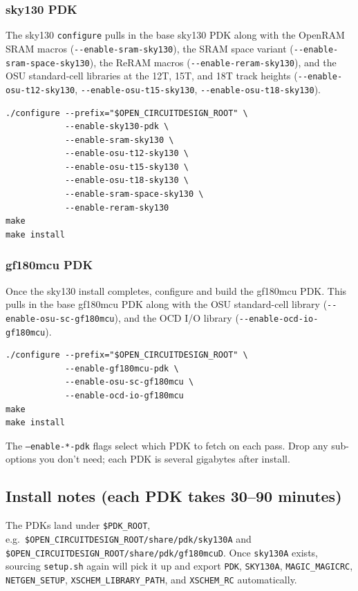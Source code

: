 \documentclass[11pt]{article}
\begin{document}
\subsubsection*{sky130 PDK}

The sky130 \texttt{configure} pulls in the base sky130 PDK along with the
OpenRAM SRAM macros (\texttt{-{}-enable-sram-sky130}), the SRAM space
variant (\texttt{-{}-enable-sram-space-sky130}), the ReRAM macros
(\texttt{-{}-enable-reram-sky130}), and the OSU standard-cell libraries at
the 12T, 15T, and 18T track heights
(\texttt{-{}-enable-osu-t12-sky130}, \texttt{-{}-enable-osu-t15-sky130},
\texttt{-{}-enable-osu-t18-sky130}).

\begin{lstlisting}
./configure --prefix="$OPEN_CIRCUITDESIGN_ROOT" \
            --enable-sky130-pdk \
            --enable-sram-sky130 \
            --enable-osu-t12-sky130 \
            --enable-osu-t15-sky130 \
            --enable-osu-t18-sky130 \
            --enable-sram-space-sky130 \
            --enable-reram-sky130
make
make install
\end{lstlisting}

\subsubsection*{gf180mcu PDK}

Once the sky130 install completes, configure and build the gf180mcu PDK.
This pulls in the base gf180mcu PDK along with the OSU standard-cell
library (\texttt{-{}-enable-osu-sc-gf180mcu}), and the OCD I/O library
(\texttt{-{}-enable-ocd-io-gf180mcu}).

\begin{lstlisting}
./configure --prefix="$OPEN_CIRCUITDESIGN_ROOT" \
            --enable-gf180mcu-pdk \
            --enable-osu-sc-gf180mcu \
            --enable-ocd-io-gf180mcu 
make
make install
\end{lstlisting}

The \texttt{--enable-*-pdk} flags select which PDK to fetch on each pass.
Drop any sub-options you don't need; each PDK is several gigabytes after
install.

\subsection{Install notes (each PDK takes 30--90 minutes)}

The PDKs land under \texttt{\$PDK\_ROOT}, e.g.\
\texttt{\$OPEN\_CIRCUITDESIGN\_ROOT/share/pdk/sky130A} and
\texttt{\$OPEN\_CIRCUITDESIGN\_ROOT/share/pdk/gf180mcuD}. Once
\texttt{sky130A} exists, sourcing \texttt{setup.sh} again will pick it up
and export \texttt{PDK}, \texttt{SKY130A}, \texttt{MAGIC\_MAGICRC},
\texttt{NETGEN\_SETUP}, \texttt{XSCHEM\_LIBRARY\_PATH}, and
\texttt{XSCHEM\_RC} automatically.
\end{document}
